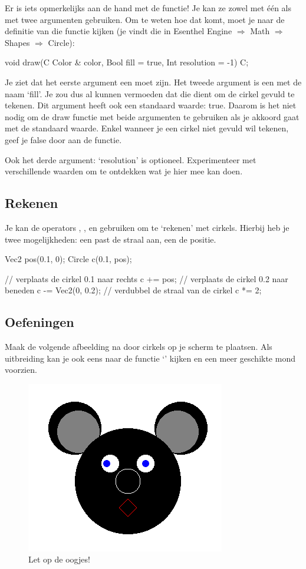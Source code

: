 Er is iets opmerkelijks aan de hand met de  functie! Je kan ze zowel met \'e\'en als met twee argumenten gebruiken. Om te weten hoe dat komt, moet je naar de definitie van die functie kijken (je vindt die in Esenthel Engine $\Rightarrow$ Math $\Rightarrow$ Shapes $\Rightarrow$ Circle):

\begin{code}
void draw(C Color & color, Bool fill = true, Int resolution = -1) C;
\end{code}

Je ziet dat het eerste argument een  moet zijn. Het tweede argument is een  met de naam `fill'. Je zou dus al kunnen vermoeden dat die dient om de cirkel gevuld te tekenen. Dit argument heeft ook een standaard waarde: true. Daarom is het niet nodig om de draw functie met beide argumenten te gebruiken als je akkoord gaat met de standaard waarde. Enkel wanneer je een cirkel niet gevuld wil tekenen, geef je false door aan de functie.


\begin{note}
Ook het derde argument: `resolution' is optioneel. Experimenteer met verschillende waarden om te ontdekken wat je hier mee kan doen.
\end{note}

\subsection{Rekenen}
Je kan de operators \eeOpp{+=}, \eeOpp{-=}, \eeOpp{/=} en \eeOpp{*=} gebruiken om te `rekenen' met cirkels. Hierbij heb je twee mogelijkheden: een  past de straal aan, een  de positie.

\begin{code}
Vec2 pos(0.1, 0);
Circle c(0.1, pos);

// verplaats de cirkel 0.1 naar rechts
c += pos;
// verplaats de cirkel 0.2 naar beneden
c -= Vec2(0, 0.2);
// verdubbel de straal van de cirkel
c *= 2;
\end{code}

\subsection{Oefeningen}
Maak de volgende afbeelding na door cirkels op je scherm te plaatsen. Als uitbreiding kan je ook eens naar de functie `' kijken en een meer geschikte mond voorzien.

\begin{figure}[h]
\centering
\includegraphics[width=0.4\linewidth]{../images/circle_exercise}
\caption[]{Let op de oogjes!}
\label{fig:pos2D}
\end{figure}


